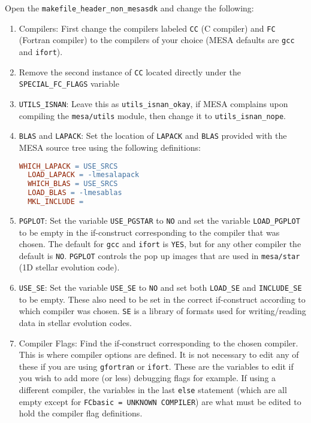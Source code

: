 Open the {\tt makefile\_header\_non\_mesasdk} and change the following:
\begin{enumerate}
\item Compilers: First change the compilers labeled {\tt CC} (C compiler) 
and {\tt FC} (Fortran compiler) to the compilers of your choice ({\sf MESA} 
defaults are {\tt gcc} and {\tt ifort}).

\item Remove the second instance of {\tt CC} located directly under the 
{\tt SPECIAL\_FC\_FLAGS} variable

\item {\tt UTILS\_ISNAN}: Leave this as {\tt utils\_isnan\_okay}, if {\sf MESA} 
complains upon compiling the {\tt mesa/utils} module, then change it to 
{\tt utils\_isnan\_nope}.

\item {\tt BLAS} and {\tt LAPACK}: Set the location of {\tt LAPACK} and 
{\tt BLAS} provided with the {\sf MESA} source tree using the following 
definitions:
\begin{lstlisting}[language=make,mathescape=false,upquote=true]
  WHICH_LAPACK = USE_SRCS
  LOAD_LAPACK = -lmesalapack
  WHICH_BLAS = USE_SRCS
  LOAD_BLAS = -lmesablas
  MKL_INCLUDE =
\end{lstlisting}

\item {\tt PGPLOT}: Set the variable {\tt USE\_PGSTAR} to {\tt NO} and set 
the variable {\tt LOAD\_PGPLOT} to be empty in the if-construct corresponding 
to the compiler that was chosen. The default for {\tt gcc} and {\tt ifort} is 
{\tt YES}, but for any other compiler the default is {\tt NO}. {\tt PGPLOT} 
controls the pop up images that are used in {\tt mesa/star} (1D stellar 
evolution code). 

\item {\tt USE\_SE}: Set the variable {\tt USE\_SE} to {\tt NO} and set both 
{\tt LOAD\_SE} and {\tt INCLUDE\_SE} to be empty. These also need to be set 
in the correct if-construct according to which compiler was chosen. 
{\tt SE} is a library of 
formats used for writing/reading data in stellar evolution codes.

\item Compiler Flags: Find the if-construct corresponding to the chosen 
compiler. This is where compiler options are defined. It is not necessary to 
edit any of these if you are using {\tt gfortran} or {\tt ifort}. These are 
the variables to edit if you wish to add more (or less) debugging flags 
for example. If using a different compiler, the variables in the last 
{\tt else} statement (which are all empty except for 
{\tt FCbasic = UNKNOWN COMPILER}) are what must be edited to hold the compiler 
flag definitions. 


\end{enumerate}
